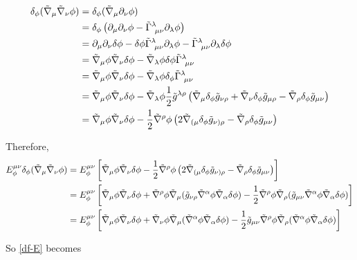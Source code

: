 \begin{align}
  \delta_\phi (\tilde{\nabla}_\mu\tilde{\nabla}_\nu\phi )&=\delta_\phi (\tilde{\nabla}_\mu\partial_\nu \phi )\\
  &=\delta_\phi \left(\partial_\mu \partial_\nu \phi -\tilde{\Gamma }^\lambda_{~\mu\nu }\partial_\lambda\phi \right)\\
  &=\partial_\mu\partial_\nu\delta \phi -\delta \phi\tilde{\Gamma }^\lambda_{~\mu\nu }\partial_\lambda\phi-\tilde{\Gamma }^\lambda_{~\mu\nu }\partial_\lambda\delta\phi \\
  &=\tilde{\nabla}_\mu\phi\tilde{\nabla}_\nu\delta \phi -\tilde{\nabla}_\lambda\phi\delta\phi \tilde{\Gamma }^\lambda_{~\mu\nu }\\
  &=\tilde{\nabla}_\mu\phi\tilde{\nabla}_\nu\delta \phi -\tilde{\nabla}_\lambda\phi \delta_\phi \tilde{\Gamma }^\lambda_{~\mu\nu }\\
  &=\tilde{\nabla}_\mu\phi\tilde{\nabla}_\nu\delta \phi-\tilde{\nabla}_\lambda\phi\frac{1}{2}\tilde{g}^{\lambda\rho }\left(\tilde{\nabla}_\mu\delta_\phi \tilde{g}_{\nu\rho }+\tilde{\nabla}_\nu \delta_\phi \tilde{g}_{\mu\rho }-\tilde{\nabla}_\rho \delta_\phi \tilde{g}_{\mu\nu }\right)\\
  &=\tilde{\nabla}_\mu\phi\tilde{\nabla}_\nu\delta \phi-\frac{1}{2}\tilde{\nabla}^\rho\phi \left(2\tilde{\nabla}_{(\mu }\delta_\phi \tilde{g}_{\nu)\rho }-\tilde{\nabla}_\rho \delta_\phi \tilde{g}_{\mu\nu }\right)
\end{align}


Therefore,
\begin{align}
  E^{\mu\nu }_\phi \delta_\phi (\tilde{\nabla}_\mu\tilde{\nabla}_\nu\phi )&=E^{\mu\nu }_\phi \left[\tilde{\nabla}_\mu\phi\tilde{\nabla}_\nu\delta \phi-\frac{1}{2}\tilde{\nabla}^\rho\phi \left(2\tilde{\nabla}_{(\mu }\delta_\phi \tilde{g}_{\nu)\rho }-\tilde{\nabla}_\rho \delta_\phi \tilde{g}_{\mu\nu }\right)\right]\\
  &=E^{\mu\nu }_\phi \left[\tilde{\nabla}_\mu\phi\tilde{\nabla}_\nu\delta \phi+\tilde{\nabla}^\rho\phi\tilde{\nabla}_\mu(\tilde{g}_{\nu\rho }\tilde{\nabla}^\alpha\phi\tilde{\nabla}_\alpha\delta\phi )-\frac{1}{2}\tilde{\nabla}^\rho\phi\tilde{\nabla}_\rho (\tilde{g}_{\mu\nu }\tilde{\nabla}^\alpha\phi\tilde{\nabla}_\alpha\delta\phi )\right]\\
  &=E^{\mu\nu }_\phi \left[\tilde{\nabla}_\mu\phi\tilde{\nabla}_\nu\delta\phi +\tilde{\nabla}_\nu\phi \tilde{\nabla}_\mu(\tilde{\nabla}^\alpha\phi\tilde{\nabla}_\alpha\delta\phi )-\frac{1}{2}\tilde{g}_{\mu\nu }\tilde{\nabla}^\rho\phi\tilde{\nabla}_\rho(\tilde{\nabla}^\alpha\phi\tilde{\nabla}_\alpha\delta\phi )\right]
\end{align}

So \eqref{df-E} becomes



